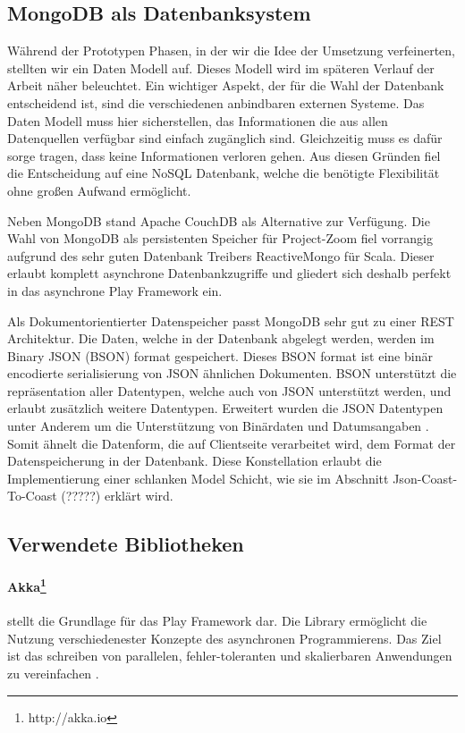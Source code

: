 \subsection{MongoDB als Datenbanksystem}
Während der Prototypen Phasen, in der wir die Idee der Umsetzung verfeinerten, stellten wir ein Daten Modell auf. Dieses Modell wird im späteren Verlauf der Arbeit näher beleuchtet. Ein wichtiger Aspekt, der für die Wahl der Datenbank entscheidend ist, sind die verschiedenen anbindbaren externen Systeme. Das Daten Modell muss hier sicherstellen, das Informationen die aus allen Datenquellen verfügbar sind einfach zugänglich sind. Gleichzeitig muss es dafür sorge tragen, dass keine Informationen verloren gehen. Aus diesen Gründen fiel die Entscheidung auf eine NoSQL Datenbank, welche die benötigte Flexibilität ohne großen Aufwand ermöglicht.

Neben MongoDB stand Apache CouchDB als Alternative zur Verfügung. Die Wahl von MongoDB als persistenten Speicher für Project-Zoom fiel vorrangig aufgrund des sehr guten Datenbank Treibers ReactiveMongo für Scala. Dieser erlaubt komplett asynchrone Datenbankzugriffe und gliedert sich deshalb perfekt in das asynchrone Play Framework ein.

Als Dokumentorientierter Datenspeicher passt MongoDB sehr gut zu einer REST Architektur. Die Daten, welche in der Datenbank abgelegt werden, werden im Binary JSON (BSON) format gespeichert. Dieses BSON format ist eine binär encodierte serialisierung von JSON ähnlichen Dokumenten. BSON unterstützt die repräsentation aller Datentypen, welche auch von JSON unterstützt werden, und erlaubt zusätzlich weitere Datentypen. Erweitert wurden die JSON Datentypen unter Anderem um die Unterstützung von Binärdaten und Datumsangaben \cite{bson}. Somit ähnelt die Datenform, die auf Clientseite verarbeitet wird, dem Format der Datenspeicherung in der Datenbank. Diese Konstellation erlaubt die Implementierung einer schlanken Model Schicht, wie sie im Abschnitt Json-Coast-To-Coast (?????) erklärt wird.

\subsection{Verwendete Bibliotheken}

\paragraph{Akka\footnote{http://akka.io}} stellt die Grundlage für das Play Framework dar. Die Library ermöglicht die Nutzung verschiedenester Konzepte des asynchronen Programmierens. Das Ziel ist das schreiben von parallelen, fehler-toleranten und skalierbaren Anwendungen zu vereinfachen \cite{what-is-akka}. 

